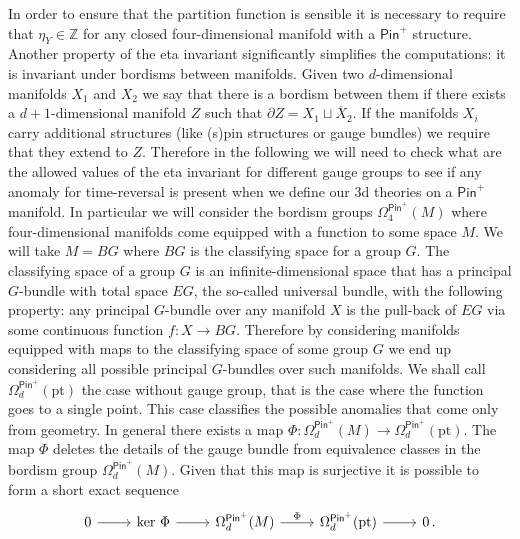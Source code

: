 \documentclass[12pt]{article}%
\numberwithin{equation}{section}
\renewcommand{\(}{\left(}
\renewcommand{\)}{\right)}
\renewcommand{\[}{\left[}
\renewcommand{\]}{\right]}
\begin{document}
In order to ensure that the partition function is sensible it is necessary to require that $\eta_{Y} \in \mathbb Z$ for any closed four-dimensional manifold with a $\mathsf {Pin}^+$ structure. Another property of the eta invariant significantly simplifies the computations: it is invariant under bordisms between manifolds. Given two $d$-dimensional manifolds $X_1$ and $X_2$ we say that there is a bordism between them if there exists a $d+1$-dimensional manifold $Z$ such that $\partial Z = X_1 \sqcup \overline{X}_2$. If the manifolds $X_i$ carry additional structures (like (s)pin structures or gauge bundles) we require that they extend to $Z$. Therefore in the following we will need to check what are the allowed values of the eta invariant for different gauge groups to see if any anomaly for time-reversal is present when we define our 3d theories on a $\mathsf{Pin}^+$ manifold. In particular we will consider the bordism groups $\Omega_4^{\mathsf{Pin}^+}(M)$ where four-dimensional manifolds come equipped with a function to some space $M$. We will take $M = BG$ where $BG$ is the classifying space for a group $G$. The classifying space of a group $G$ is an infinite-dimensional space that has a principal $G$-bundle with total space $EG$, the so-called universal bundle, with the following property: any principal $G$-bundle over any manifold $X$ is the pull-back of $EG$ via some continuous function $f: X \rightarrow BG$. Therefore by considering manifolds equipped with maps to the classifying space of some group $G$ we end up considering all possible principal $G$-bundles over such manifolds. We shall call $\Omega_d^{\mathsf{Pin}^+}(\text{pt})$ the case without gauge group, that is the case where the function goes to a single point. This case classifies the possible anomalies that come only from geometry. In general there exists a map $\Phi : \Omega_d^{\mathsf{Pin}^+}(M)\rightarrow \Omega_d^{\mathsf{Pin}^+}(\text{pt})$. The map $\Phi$ deletes the details of the gauge bundle from equivalence classes in the bordism group $\Omega_d^{\mathsf{Pin}^+}(M)$. Given that this map is surjective it is possible to form a short exact sequence
%
\begin{equation}
\begin{tikzcd}
 0 \arrow[r]& \text{ker } \Phi \arrow[r]& \Omega^{\mathsf{Pin}^+}_d(M) \arrow[r,"\Phi"]& \Omega^{\mathsf{Pin}^+}_d(\text{pt}) \arrow[r]& 0\,.
 \end{tikzcd}
\end{equation}
%
\end{document}
